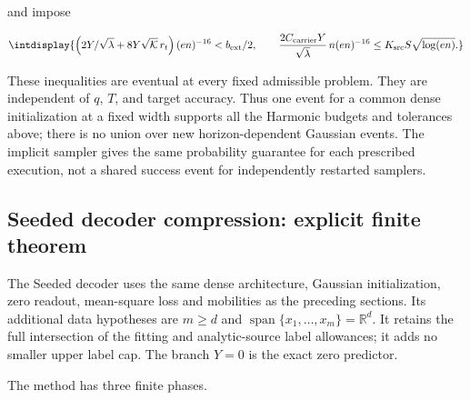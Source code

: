 
and impose


\begingroup\renewcommand{\theHequation}{intdisplay.201}
\begin{equation}
\intdisplay{
\left(2Y/\sqrt\lambda+8Y\sqrt{\mathcal K}\,r_t\right)(en)^{-16}
          <b_{\rm ext}/2,
\qquad
\frac{2C_{\rm carrier}Y}{\sqrt\lambda}\,n(en)^{-16}
          \le K_{\rm src}S\sqrt{\log(en)}.
}
\label{int:eq-0086-harmonic-analytic-extension-gates}
\end{equation}
\endgroup


These inequalities are eventual at every fixed admissible problem. They are independent of \(q\), \(T\), and target accuracy. Thus one event for a common dense initialization at a fixed width supports all the Harmonic budgets and tolerances above; there is no union over new horizon-dependent Gaussian events. The implicit sampler gives the same probability guarantee for each prescribed execution, not a shared success event for independently restarted samplers.


\subsection{Seeded decoder compression: explicit finite theorem}
\label{int:seeded-decoder-detailed}


The Seeded decoder uses the same dense architecture, Gaussian initialization, zero readout, mean-square loss and mobilities as the preceding sections. Its additional data hypotheses are \(m\ge d\) and \(\operatorname{span}\{x_1,\allowbreak \ldots,\allowbreak x_m\}=\mathbb R^d\). It retains the full intersection of the fitting and analytic-source label allowances; it adds no smaller upper label cap. The branch \(Y=0\) is the exact zero predictor.



The method has three finite phases.


